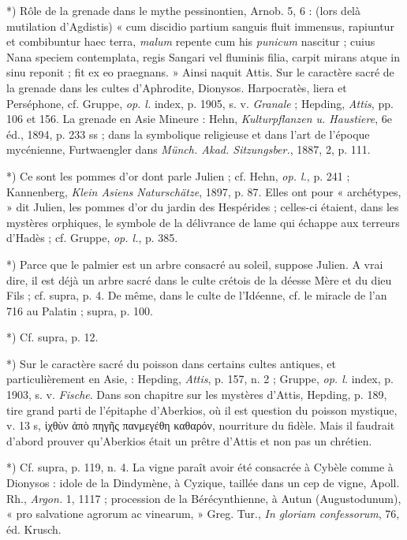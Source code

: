 \documentclass[a4paper, 11pt, oneside, polutonikogreek, french]{article}
\begin{document}
*) Rôle de la grenade dans le mythe pessinontien, Arnob. 5, 6 : (lors delà mutilation d'Agdistis) « cum discidio partium sanguis fluit immensus, rapiuntur et combibuntur haec terra, \emph{malum} repente cum his \emph{punicum} nascitur ; cuius Nana speciem contemplata, regis Sangari vel fluminis filia, carpit mirans atque in sinu reponit ; fit ex eo praegnans. » Ainsi naquit Attis. Sur le caractère sacré de la grenade dans les cultes d'Aphrodite, Dionysos. Harpocratès, liera et Perséphone, cf. Gruppe, \emph{op. l.} index, p. 1905, s. v. \emph{Granale} ; Hepding, \emph{Attis}, pp. 106 et 156. La grenade en Asie Mineure : Hehn, \emph{Kulturpflanzen u. Haustiere}, 6e éd., 1894, p. 233 ss ; dans la symbolique religieuse et dans l'art de l'époque mycénienne, Furtwaengler dans \emph{Münch. Akad. Sitzungsber.}, 1887, 2, p. 111.

*) Ce sont les pommes d'or dont parle Julien ; cf. Hehn, \emph{op. l.}, p. 241 ; Kannenberg, \emph{Klein Asiens Naturschätze}, 1897, p. 87. Elles ont pour « archétypes, » dit Julien, les pommes d'or du jardin des Hespérides ; celles-ci étaient, dans les mystères orphiques, le symbole de la délivrance de lame qui échappe aux terreurs d'Hadès ; cf. Gruppe, \emph{op. l.}, p. 385.

*) Parce que le palmier est un arbre consacré au soleil, suppose Julien. A vrai dire, il est déjà un arbre sacré dans le culte crétois de la déesse Mère et du dieu Fils ; cf. supra, p. 4. De même, dans le culte de l'Idéenne, cf. le miracle de l'an 716 au Palatin ; supra, p. 100.

*) Cf. supra, p. 12.

*) Sur le caractère sacré du poisson dans certains cultes antiques, et particulièrement en Asie, : Hepding, \emph{Attis}, p. 157, n. 2 ; Gruppe, \emph{op. l.} index, p. 1903, s. v. \emph{Fische}. Dans son chapitre sur les mystères d'Attis, Hepding, p. 189, tire grand parti de l'épitaphe d'Aberkios, où il est question du poisson mystique, v. 13 s, ἰχθὺν ἀπὸ πηγῆς πανμεγέθη καθαρόν, nourriture du fidèle. Mais il faudrait d'abord prouver qu'Aberkios était un prêtre d'Attis et non pas un chrétien.

*) Cf. supra, p. 119, n. 4. La vigne paraît avoir été consacrée à Cybèle comme à Dionysos : idole de la Dindymène, à Cyzique, taillée dans un cep de vigne, Apoll. Rh., \emph{Argon.} 1, 1117 ; procession de la Bérécynthienne, à Autun (Augustodunum), « pro salvatione agrorum ac vinearum, » Greg. Tur., \emph{In gloriam confessorum}, 76, éd. Krusch.
\end{document}
